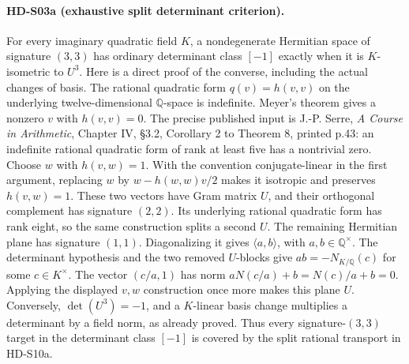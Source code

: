 \paragraph{HD-S03a (exhaustive split determinant criterion).}
For every imaginary quadratic field \(K\), a nondegenerate Hermitian
space of signature \((3,3)\) has ordinary determinant class \([-1]\)
exactly when it is \(K\)-isometric to \(U^3\).
Here is a direct proof of the converse, including the actual changes
of basis. The rational quadratic form \(q(v)=h(v,v)\) on the underlying
twelve-dimensional \(\mathbb Q\)-space is indefinite. Meyer's theorem
gives a nonzero \(v\) with \(h(v,v)=0\).
The precise published input is J.-P. Serre,
\emph{A Course in Arithmetic}, Chapter IV, \S3.2, Corollary 2 to
Theorem 8, printed p.43: an indefinite rational quadratic form of
rank at least five has a nontrivial zero.
Choose \(w\) with \(h(v,w)=1\). With the convention conjugate-linear
in the first argument, replacing \(w\) by
\(w-h(w,w)v/2\) makes it isotropic and preserves \(h(v,w)=1\).
These two vectors have Gram matrix \(U\), and their orthogonal
complement has signature \((2,2)\). Its underlying rational quadratic
form has rank eight, so the same construction splits a second \(U\).
The remaining Hermitian plane has signature \((1,1)\). Diagonalizing
it gives \(\langle a,b\rangle\), with \(a,b\in\mathbb Q^\times\).
The determinant hypothesis and the two removed \(U\)-blocks give
\(ab=-N_{K/\mathbb Q}(c)\) for some \(c\in K^\times\).
The vector \((c/a,1)\) has norm
\(aN(c/a)+b=N(c)/a+b=0\). Applying the displayed \(v,w\)
construction once more makes this plane \(U\).
Conversely, \(\det(U^3)=-1\), and a \(K\)-linear basis change
multiplies a determinant by a field norm, as already proved.
Thus every signature-\((3,3)\) target in the determinant class
\([-1]\) is covered by the split rational transport in HD-S10a.

